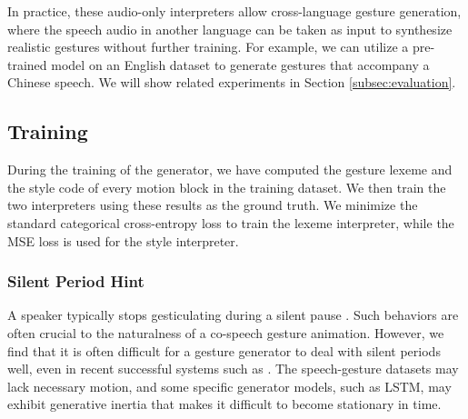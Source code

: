\documentclass[acmtog,authorversion]{acmart}
\begin{document}
In practice, these audio-only interpreters allow cross-language gesture generation, where the speech audio in another language can be taken as input to synthesize realistic gestures without further training. For example, we can utilize a pre-trained model on an English dataset to generate gestures that accompany a Chinese speech. We will show related experiments in Section \ref{subsec:evaluation}.

\subsection{Training}
During the training of the generator, we have computed the gesture lexeme  and the style code  of every motion block in the training dataset. We then train the two interpreters using these results as the ground truth. We minimize the standard categorical cross-entropy loss to train the lexeme interpreter, while the MSE loss is used for the style interpreter.

\subsubsection{Silent Period Hint}
A speaker typically stops gesticulating during a silent pause \cite{graziano2018silence}. Such behaviors are often crucial to the naturalness of a co-speech gesture animation. However, we find that it is often difficult for a gesture generator to deal with silent periods well, even in recent successful systems such as \cite{alexanderson2020style,kucherenko2020gesticulator}. The speech-gesture datasets may lack necessary motion, and some specific generator models, such as LSTM, may exhibit generative inertia that makes it difficult to become stationary in time.
\end{document}
